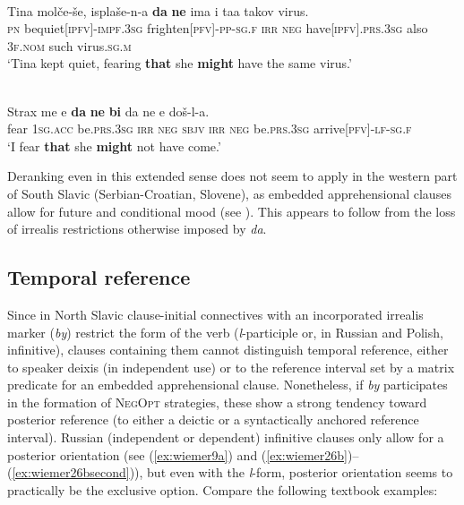 \documentclass[output=paper,colorlinks,citecolor=brown]{langscibook}
\begin{document}
\ea
\label{ex:wiemer24} 
 \\
\gll Tina molče-še, isplaše-n-a \textbf{da} \textbf{ne} ima i taa takov virus. \\
\textsc{pn} be\textunderscore quiet\textsc{[ipfv]-impf.3sg} frighten\textsc{[pfv]-pp-sg.f} \textsc{irr} \textsc{neg} have\textsc{[ipfv].prs.3sg} also \textsc{3f.nom} such virus\textsc{.sg.m} \\
\glt `Tina kept quiet, fearing \textbf{that} she \textbf{might} have the same virus.' \\
\z


\ea
\label{ex:wiemer25} 
 \\
\gll Strax me e \textbf{da} \textbf{ne} \textbf{bi} da ne e doš-l-a. \\
fear \textsc{1sg.acc} be.\textsc{prs.3sg} \textsc{irr} \textsc{neg} \textsc{sbjv} \textsc{irr} \textsc{neg} be\textsc{.prs.3sg} arrive\textsc{[pfv]-lf-sg.f} \\
\glt `I fear \textbf{that} she \textbf{might} not have come.'
\z

 Deranking even in this extended sense does not seem to apply in the western part of South Slavic (Serbian-Croatian, Slovene), as embedded apprehensional clauses allow for future and conditional mood (see ). This appears to follow from the loss of irrealis restrictions otherwise imposed by \textit{da}.

\subsection{Temporal reference}
\label{subsec:tempref}

Since in North Slavic clause-initial connectives with an incorporated irrealis marker (\textit{by}) restrict the form of the verb (\textit{l}-participle or, in Russian and Polish, infinitive), clauses containing them cannot distinguish temporal reference, either to speaker deixis (in independent use) or to the reference interval set by a matrix predicate for an embedded apprehensional clause. Nonetheless, if \textit{by} participates in the formation of \textsc{NegOpt} strategies, these show a strong tendency toward posterior reference (to either a deictic or a syntactically anchored reference interval). Russian (independent or dependent) infinitive clauses only allow for a posterior orientation (see (\ref{ex:wiemer9a}) and (\ref{ex:wiemer26b})--(\ref{ex:wiemer26bsecond})), but even with the \textit{l}-form, posterior orientation seems to practically be the  exclusive option. Compare the following textbook examples:
\end{document}
